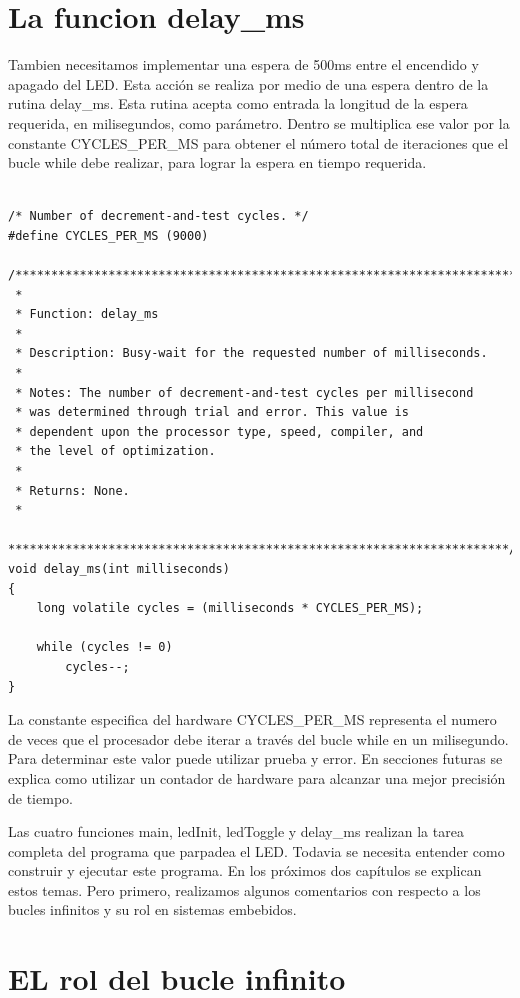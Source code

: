 \documentclass[12pt]{article}
\begin{document}
\section *{La funcion delay\_ms}

Tambien necesitamos implementar una espera de 500ms entre el encendido y apagado
del LED. Esta acción se realiza por medio de una espera dentro de la rutina
delay\_ms.
Esta rutina acepta como entrada la longitud de la espera requerida, en milisegundos, como parámetro. Dentro se multiplica ese valor por la constante
CYCLES\_PER\_MS para obtener el número total de iteraciones que el bucle
while debe realizar, para lograr la espera en tiempo requerida.


\begin{verbatim}

/* Number of decrement-and-test cycles. */
#define CYCLES_PER_MS (9000)

/**********************************************************************
 *
 * Function: delay_ms
 *
 * Description: Busy-wait for the requested number of milliseconds.
 *
 * Notes: The number of decrement-and-test cycles per millisecond
 * was determined through trial and error. This value is
 * dependent upon the processor type, speed, compiler, and
 * the level of optimization.  
 *
 * Returns: None.
 *
 **********************************************************************/
void delay_ms(int milliseconds)
{
    long volatile cycles = (milliseconds * CYCLES_PER_MS);

    while (cycles != 0)
        cycles--;
}
\end{verbatim}

La constante especifica del hardware CYCLES\_PER\_MS representa el numero
de veces que el procesador debe iterar a través del bucle while en un milisegundo.
Para determinar este valor puede utilizar prueba y error.
En secciones futuras se explica como utilizar un contador de hardware para
alcanzar una mejor precisión de tiempo. 

Las cuatro funciones main, ledInit, ledToggle y delay\_ms realizan la tarea completa del programa que parpadea el LED. Todavia se necesita entender como construir y ejecutar este programa. En los próximos dos capítulos se explican estos temas.
Pero primero, realizamos algunos comentarios con respecto a los bucles infinitos y su rol en sistemas embebidos.

\section *{EL rol del bucle infinito}
\end{document}
